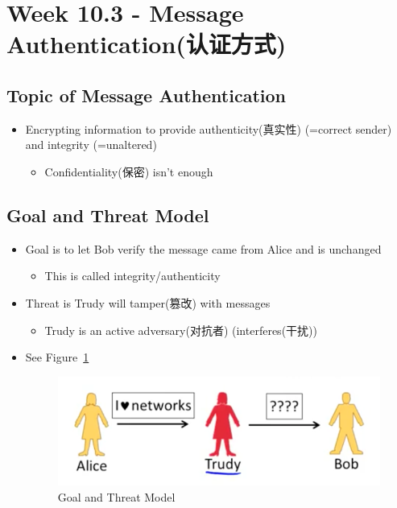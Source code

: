 \documentclass[12pt]{ctexart}   %
\begin{document}
\section{Week 10.3 - Message Authentication(认证方式)}
	\subsection{Topic of Message Authentication}
	\begin{itemize}
		\item Encrypting information to provide authenticity(真实性) (=correct sender) and integrity (=unaltered)
		\begin{itemize}
			\item Confidentiality(保密) isn't enough
		\end{itemize}
	\end{itemize}

	\subsection{Goal and Threat Model}
	\begin{itemize}
		\item Goal is to let Bob verify the message came from Alice and is unchanged
		\begin{itemize}
			\item This is called integrity/authenticity
		\end{itemize}

		\item Threat is Trudy will tamper(篡改) with messages
		\begin{itemize}
			\item Trudy is an active adversary(对抗者) (interferes(干扰))
		\end{itemize}
		\item See Figure~\ref{fig:10-3-1}
		  
		\begin{figure}[h!] %
		\centering
		\includegraphics[scale=0.7]{images/10-3-1}
		\caption{Goal and Threat Model}
		\label{fig:10-3-1}
		\end{figure}
	\end{itemize}
\end{document}
